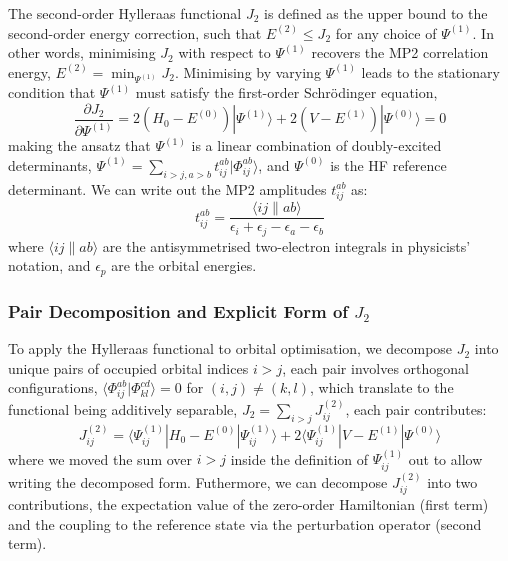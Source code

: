 The second-order Hylleraas functional $J_2$ is defined as the upper bound to the second-order energy correction, such that $E^{(2)} \leq J_2$ for any choice of $\Psi^{(1)}$. In other words, minimising $J_2$ with respect to $\Psi^{(1)}$ recovers the MP2 correlation energy, $E^{(2)} = \min_{\Psi^{(1)}} J_2$. Minimising by varying $\Psi^{(1)}$ leads to the stationary condition that $\Psi^{(1)}$ must satisfy the first-order Schrödinger equation,
\begin{equation}
    \frac{\partial J_2}{\partial \Psi^{(1)}} = 2 (H_0 - E^{(0)})|\Psi^{(1)}\rangle + 2(V - E^{(1)})|\Psi^{(0)}\rangle = 0
\end{equation}
making the ansatz that $\Psi^{(1)}$ is a linear combination of doubly-excited determinants, $\Psi^{(1)} = \sum_{i>j,a>b} t_{ij}^{ab} |\Phi_{ij}^{ab}\rangle$, and $\Psi^{(0)}$ is the HF reference determinant. We can write out the MP2 amplitudes $t_{ij}^{ab}$ as:
\begin{equation}
    t_{ij}^{ab} = \frac{\langle ij\|ab\rangle}{\epsilon_i + \epsilon_j - \epsilon_a - \epsilon_b}
\end{equation}
where $\langle ij\|ab\rangle$ are the antisymmetrised two-electron integrals in physicists' notation, and $\epsilon_p$ are the orbital energies. 

\subsubsection{Pair Decomposition and Explicit Form of \texorpdfstring{$J_2$}{J2}}
To apply the Hylleraas functional to orbital optimisation, we decompose $J_2$ into unique pairs of occupied orbital indices $i>j$, each pair involves orthogonal configurations, $\langle\Phi_{ij}^{ab}|\Phi_{kl}^{cd}\rangle = 0$ for $(i,j) \neq (k,l)$, which translate to the functional being additively separable, $J_2 = \sum_{i>j} J_{ij}^{(2)}$, each pair contributes:
\begin{equation}
    J_{ij}^{(2)} = \langle\Psi^{(1)}_{ij}|H_0 - E^{(0)}|\Psi^{(1)}_{ij}\rangle + 2\langle\Psi^{(1)}_{ij}|V - E^{(1)}|\Psi^{(0)}\rangle
\end{equation}
where we moved the sum over $i>j$ inside the definition of $\Psi^{(1)}_{ij}$ out to allow writing the decomposed form. Futhermore, we can decompose $J_{ij}^{(2)}$ into two contributions, the expectation value of the zero-order Hamiltonian (first term) and the coupling to the reference state via the perturbation operator (second term). 

